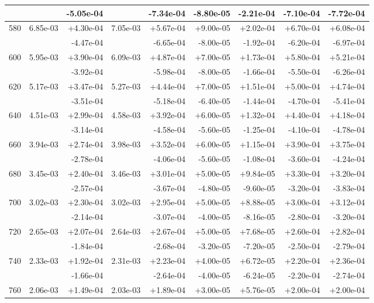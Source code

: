 \begin{tabular}{|c|r|r|r|r|r|r|r|r|}
 & & -5.05e-04 & & -7.34e-04 & -8.80e-05 & -2.21e-04 & -7.10e-04 & -7.72e-04 \\
\hline
580 & 6.85e-03 & +4.30e-04 & 7.05e-03 & +5.67e-04 & +9.00e-05 & +2.02e-04 & +6.70e-04 & +6.08e-04\\
 & & -4.47e-04 & & -6.65e-04 & -8.00e-05 & -1.92e-04 & -6.20e-04 & -6.97e-04 \\
\hline
600 & 5.95e-03 & +3.90e-04 & 6.09e-03 & +4.87e-04 & +7.00e-05 & +1.73e-04 & +5.80e-04 & +5.21e-04\\
 & & -3.92e-04 & & -5.98e-04 & -8.00e-05 & -1.66e-04 & -5.50e-04 & -6.26e-04 \\
\hline
620 & 5.17e-03 & +3.47e-04 & 5.27e-03 & +4.44e-04 & +7.00e-05 & +1.51e-04 & +5.00e-04 & +4.74e-04\\
 & & -3.51e-04 & & -5.18e-04 & -6.40e-05 & -1.44e-04 & -4.70e-04 & -5.41e-04 \\
\hline
640 & 4.51e-03 & +2.99e-04 & 4.58e-03 & +3.92e-04 & +6.00e-05 & +1.32e-04 & +4.40e-04 & +4.18e-04\\
 & & -3.14e-04 & & -4.58e-04 & -5.60e-05 & -1.25e-04 & -4.10e-04 & -4.78e-04 \\
\hline
660 & 3.94e-03 & +2.74e-04 & 3.98e-03 & +3.52e-04 & +6.00e-05 & +1.15e-04 & +3.90e-04 & +3.75e-04\\
 & & -2.78e-04 & & -4.06e-04 & -5.60e-05 & -1.08e-04 & -3.60e-04 & -4.24e-04 \\
\hline
680 & 3.45e-03 & +2.40e-04 & 3.46e-03 & +3.01e-04 & +5.00e-05 & +9.84e-05 & +3.30e-04 & +3.20e-04\\
 & & -2.57e-04 & & -3.67e-04 & -4.80e-05 & -9.60e-05 & -3.20e-04 & -3.83e-04 \\
\hline
700 & 3.02e-03 & +2.30e-04 & 3.02e-03 & +2.95e-04 & +5.00e-05 & +8.88e-05 & +3.00e-04 & +3.12e-04\\
 & & -2.14e-04 & & -3.07e-04 & -4.00e-05 & -8.16e-05 & -2.80e-04 & -3.20e-04 \\
\hline
720 & 2.65e-03 & +2.07e-04 & 2.64e-03 & +2.67e-04 & +5.00e-05 & +7.68e-05 & +2.60e-04 & +2.82e-04\\
 & & -1.84e-04 & & -2.68e-04 & -3.20e-05 & -7.20e-05 & -2.50e-04 & -2.79e-04 \\
\hline
740 & 2.33e-03 & +1.92e-04 & 2.31e-03 & +2.23e-04 & +4.00e-05 & +6.72e-05 & +2.20e-04 & +2.36e-04\\
 & & -1.66e-04 & & -2.64e-04 & -4.00e-05 & -6.24e-05 & -2.20e-04 & -2.74e-04 \\
\hline
760 & 2.06e-03 & +1.49e-04 & 2.03e-03 & +1.89e-04 & +3.00e-05 & +5.76e-05 & +2.00e-04 & +2.00e-04\\

\end{tabular}

